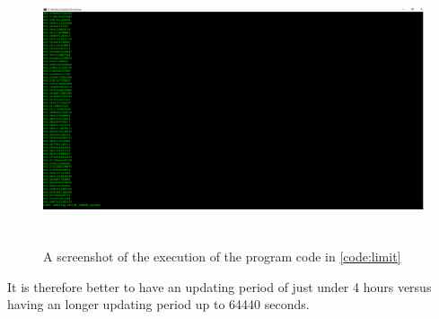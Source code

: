 \begin{figure}[H]
\centering
\includegraphics[height=8.0cm]{Project_Report/Images/limit.PNG}
\caption{A screenshot of the execution of the program code in \ref{code:limit}}
\label{fig:limit}
\end{figure}

It is therefore better to have an updating period of just under 4 hours versus having an longer updating period up to 64440 seconds. 



\newpage